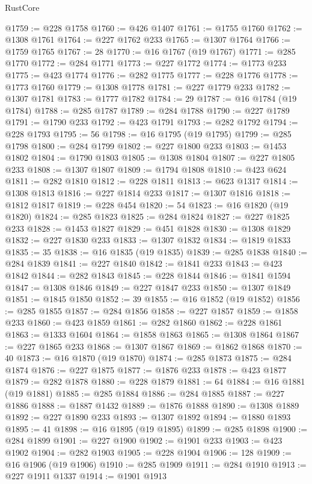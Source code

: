 \begin{lexlean}{RustCore}
\begin{coremodule}
@1759 := @228 @1758
@1760 := @426 @1407
@1761 := @1755 @1760
@1762 := @1308 @1761
@1764 := @227 @1762 @233
@1765 := @1307 @1764
@1766 := @1759 @1765
@1767 := 28
@1770 := @16 @1767 (@19 @1767)
@1771 := @285 @1770
@1772 := @284 @1771
@1773 := @227 @1772
@1774 := @1773 @233
@1775 := @423 @1774
@1776 := @282 @1775
@1777 := @228 @1776
@1778 := @1773 @1760
@1779 := @1308 @1778
@1781 := @227 @1779 @233
@1782 := @1307 @1781
@1783 := @1777 @1782
@1784 := 29
@1787 := @16 @1784 (@19 @1784)
@1788 := @285 @1787
@1789 := @284 @1788
@1790 := @227 @1789
@1791 := @1790 @233
@1792 := @423 @1791
@1793 := @282 @1792
@1794 := @228 @1793
@1795 := 56
@1798 := @16 @1795 (@19 @1795)
@1799 := @285 @1798
@1800 := @284 @1799
@1802 := @227 @1800 @233
@1803 := @1453 @1802
@1804 := @1790 @1803
@1805 := @1308 @1804
@1807 := @227 @1805 @233
@1808 := @1307 @1807
@1809 := @1794 @1808
@1810 := @423 @624
@1811 := @282 @1810
@1812 := @228 @1811
@1813 := @623 @1317
@1814 := @1308 @1813
@1816 := @227 @1814 @233
@1817 := @1307 @1816
@1818 := @1812 @1817
@1819 := @228 @454
@1820 := 54
@1823 := @16 @1820 (@19 @1820)
@1824 := @285 @1823
@1825 := @284 @1824
@1827 := @227 @1825 @233
@1828 := @1453 @1827
@1829 := @451 @1828
@1830 := @1308 @1829
@1832 := @227 @1830 @233
@1833 := @1307 @1832
@1834 := @1819 @1833
@1835 := 35
@1838 := @16 @1835 (@19 @1835)
@1839 := @285 @1838
@1840 := @284 @1839
@1841 := @227 @1840
@1842 := @1841 @233
@1843 := @423 @1842
@1844 := @282 @1843
@1845 := @228 @1844
@1846 := @1841 @1594
@1847 := @1308 @1846
@1849 := @227 @1847 @233
@1850 := @1307 @1849
@1851 := @1845 @1850
@1852 := 39
@1855 := @16 @1852 (@19 @1852)
@1856 := @285 @1855
@1857 := @284 @1856
@1858 := @227 @1857
@1859 := @1858 @233
@1860 := @423 @1859
@1861 := @282 @1860
@1862 := @228 @1861
@1863 := @1333 @1604
@1864 := @1858 @1863
@1865 := @1308 @1864
@1867 := @227 @1865 @233
@1868 := @1307 @1867
@1869 := @1862 @1868
@1870 := 40
@1873 := @16 @1870 (@19 @1870)
@1874 := @285 @1873
@1875 := @284 @1874
@1876 := @227 @1875
@1877 := @1876 @233
@1878 := @423 @1877
@1879 := @282 @1878
@1880 := @228 @1879
@1881 := 64
@1884 := @16 @1881 (@19 @1881)
@1885 := @285 @1884
@1886 := @284 @1885
@1887 := @227 @1886
@1888 := @1887 @1432
@1889 := @1876 @1888
@1890 := @1308 @1889
@1892 := @227 @1890 @233
@1893 := @1307 @1892
@1894 := @1880 @1893
@1895 := 41
@1898 := @16 @1895 (@19 @1895)
@1899 := @285 @1898
@1900 := @284 @1899
@1901 := @227 @1900
@1902 := @1901 @233
@1903 := @423 @1902
@1904 := @282 @1903
@1905 := @228 @1904
@1906 := 128
@1909 := @16 @1906 (@19 @1906)
@1910 := @285 @1909
@1911 := @284 @1910
@1913 := @227 @1911 @1337
@1914 := @1901 @1913

\end{coremodule}
\end{lexlean}
